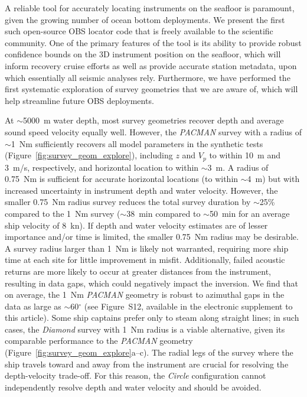 A reliable tool for accurately locating instruments on the seafloor is paramount, given the growing number of ocean bottom deployments. We present the first such open-source OBS locator code that is freely available to the scientific community. One of the primary features of the tool is its ability to provide robust confidence bounds on the 3D instrument position on the seafloor, which will inform recovery cruise efforts as well as provide accurate station metadata, upon which essentially all seismic analyses rely. Furthermore, we have performed the first systematic exploration of survey geometries that we are aware of, which will help streamline future OBS deployments.

At $\sim$5000~m water depth, most survey geometries recover depth and average sound speed velocity equally well. However, the \textit{PACMAN} survey with a radius of $\sim$1~Nm sufficiently recovers all model parameters in the synthetic tests (Figure~\ref{fig:survey_geom_explore}), including $z$ and $V_p$ to within 10~m and 3~m/s, respectively, and horizontal location to within $\sim$3~m. A radius of 0.75~Nm is sufficient for accurate horizontal locations (to within $\sim$4~m) but with increased uncertainty in instrument depth and water velocity. However, the smaller 0.75~Nm radius survey reduces the total survey duration by $\sim$25\% compared to the 1~Nm survey ($\sim$38~min compared to $\sim$50~min for an average ship velocity of 8~kn). If depth and water velocity estimates are of lesser importance and/or time is limited, the smaller 0.75~Nm radius may be desirable. A survey radius larger than 1~Nm is likely not warranted, requiring more ship time at each site for little improvement in misfit. Additionally, failed acoustic returns are more likely to occur at greater distances from the instrument, resulting in data gaps, which could negatively impact the inversion. We find that on average, the 1~Nm \textit{PACMAN} geometry is robust to azimuthal gaps in the data as large as $\sim$60$^{\circ}$ (see Figure~S12, available in the electronic supplement to this article). Some ship captains prefer only to steam along straight lines; in such cases, the \textit{Diamond} survey with 1~Nm radius is a viable alternative, given its comparable performance to the \textit{PACMAN} geometry (Figure~\ref{fig:survey_geom_explore}a--c). The radial legs of the survey where the ship travels toward and away from the instrument are crucial for resolving the depth-velocity trade-off. For this reason, the \textit{Circle} configuration cannot independently resolve depth and water velocity and should be avoided.

